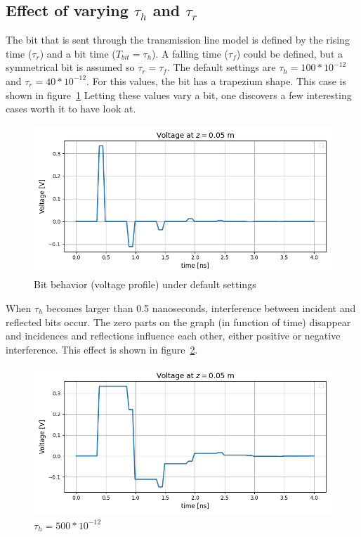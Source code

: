 \subsection{Effect of varying $\tau_h$ and $\tau_r$}
The bit that is sent through the transmission line model is defined by the rising time ($\tau_r$) and a bit time ($T_{bit} = \tau_h$). A falling time ($\tau_f$) could be defined, but a symmetrical bit is assumed so $\tau_r = \tau_f$. The default settings are $\tau_h = 100*10^{-12}$ and $\tau_r = 40*10^{-12}$. For this values, the bit has a trapezium shape. This case is shown in figure~\ref{fig:default} Letting these values vary a bit, one discovers a few interesting cases worth it to have look at.

\begin{figure}[h!]
    \centering
    \includegraphics[scale=0.5]{figures/default.png}
    \caption{Bit behavior (voltage profile) under default settings}
    \label{fig:default}
\end{figure}

When $\tau_h$ becomes larger than 0.5 nanoseconds, interference between incident and reflected bits occur. The zero parts on the graph (in function of time) disappear and incidences and reflections influence each other, either positive or negative interference. This effect is shown in figure~\ref{fig:TH}.

\begin{figure}[h!]
    \centering
    \includegraphics[scale=0.5]{figures/tau_h=0.5ns.png}
    \caption{$\tau_h = 500*10^{-12}$}
    \label{fig:TH}
\end{figure}

